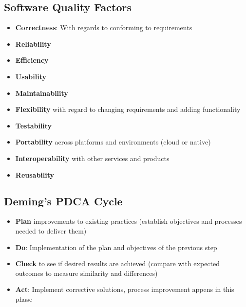 \documentclass{article}
\begin{document}
\subsection{Software Quality Factors}
\begin{itemize}
    \item \textbf{Correctness}: With regards to conforming to requirements
    
    \item \textbf{Reliability}
    
    \item\textbf{Efficiency}
    
    \item \textbf{Usability}
    
    \item \textbf{Maintainability}
    
    \item \textbf{Flexibility} with regard to changing requirements and adding functionality 
    
    \item\textbf{Testability}
    
    \item\textbf{Portability} across platforms and environments (cloud or native)
    
    \item\textbf{Interoperability} with other services and products
    
    \item\textbf{Reusability}
\end{itemize}

\subsection{Deming's PDCA Cycle}
\begin{itemize}
    \item \textbf{Plan} improvements to existing practices (establish objectives and processes needed to deliver them)
    
    \item \textbf{Do}: Implementation of the plan and objectives of the previous step
    
    \item \textbf{Check} to see if desired results are achieved (compare with expected outcomes to measure similarity and differences)
    
    \item \textbf{Act}: Implement corrective solutions, process improvement appens in this phase
\end{itemize}
\end{document}
